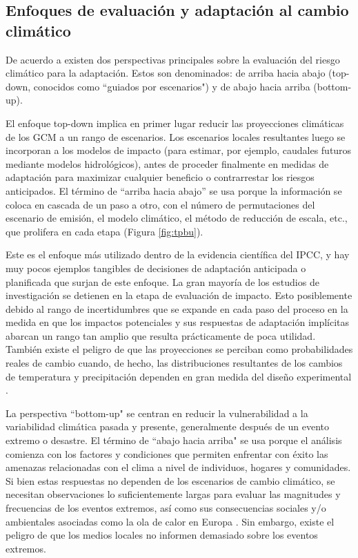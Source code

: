 \documentclass[12pt]{article}
\begin{document}
\subsection{Enfoques de evaluación y adaptación al cambio climático}

De acuerdo a \citet{Wilby2010} existen dos perspectivas principales sobre la evaluación del riesgo climático para la adaptación. Estos son denominados: de arriba hacia abajo (top-down, conocidos como ``guiados por escenarios") y de abajo hacia arriba (bottom-up).

El enfoque top-down implica en primer lugar reducir las proyecciones climáticas de los GCM a un rango de escenarios. Los escenarios locales resultantes luego se incorporan a los modelos de impacto (para estimar, por ejemplo, caudales futuros mediante modelos hidrológicos), antes de proceder finalmente en medidas de adaptación para maximizar cualquier beneficio o contrarrestar los riesgos anticipados. El término de “arriba hacia abajo” se usa porque la información se coloca en cascada de un paso a otro, con el número de permutaciones del escenario de emisión, el modelo climático, el método de reducción de escala, etc., que prolifera en cada etapa (Figura \ref{fig:tpbu}). 

Este es el enfoque más utilizado dentro de la evidencia científica del IPCC, y hay muy pocos ejemplos tangibles de decisiones de adaptación anticipada o planificada que surjan de este enfoque. La gran mayoría de los estudios de investigación se detienen en la etapa de evaluación de impacto. Esto posiblemente debido al rango de incertidumbres que se expande en cada paso del proceso en la medida en que los impactos potenciales y sus respuestas de adaptación implícitas abarcan un rango tan amplio que resulta prácticamente de poca utilidad. También existe el peligro de que las proyecciones se perciban como probabilidades reales de cambio cuando, de hecho, las distribuciones resultantes de los cambios de temperatura y precipitación dependen en gran medida del diseño experimental \citep{Dessai2004}. 



La perspectiva “bottom-up" se centran en reducir la vulnerabilidad a la variabilidad climática pasada y presente, generalmente después de un evento extremo o desastre. El término de “abajo hacia arriba" se usa porque el análisis comienza con los factores y condiciones que permiten enfrentar con éxito las amenazas relacionadas con el clima a nivel de individuos, hogares y comunidades. Si bien estas respuestas no dependen de los escenarios de cambio climático, se necesitan observaciones lo suficientemente largas para evaluar las magnitudes y frecuencias de los eventos extremos, así como sus consecuencias sociales y/o ambientales asociadas como la ola de calor en Europa \citep{Palutikof2004}. Sin embargo, existe el peligro de que los medios locales no informen demasiado sobre los eventos extremos.
\end{document}
